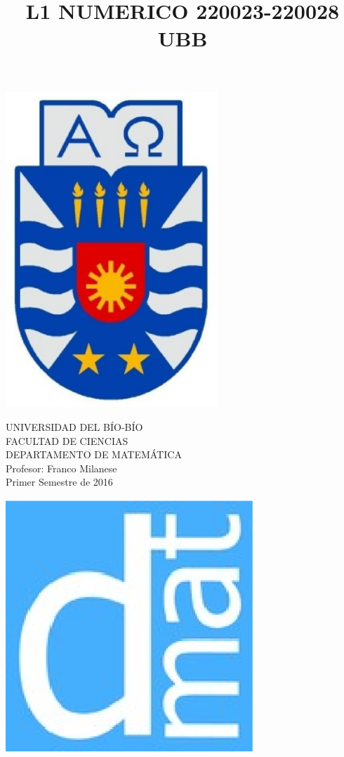 \documentclass[11pt]{article}
\begin{document}
\title{L1 NUMERICO 220023-220028 UBB}

{\begin{minipage}{2cm}
\hspace*{1cm}\includegraphics[width=0.6\textwidth]{escubo-ubb.eps}
\end{minipage}
\begin{minipage}{12cm}
\small
{\bf \rm 
{
\begin{center}
{\footnotesize UNIVERSIDAD DEL B\'IO-B\'IO} \\
{\scriptsize FACULTAD DE CIENCIAS}  \\
{\scriptsize DEPARTAMENTO DE MATEM\'ATICA}  \\
{\scriptsize Profesor:  Franco Milanese}\\
{\scriptsize Primer Semestre de 2016}
\end{center}
}}
\end{minipage}}
{\begin{minipage}{2cm}
\hspace*{-0.5cm}\vspace*{-0.05cm}\includegraphics[width=0.7\textwidth]{escudo-dmat.eps}
\end{minipage}}
\end{document}
